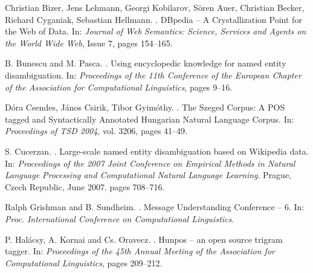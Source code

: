 \documentclass[11pt]{article}
\begin{document}
\begin{thebibliography}{}


Christian Bizer, Jens Lehmann, Georgi Kobilarov, Sören Auer, Christian Becker, Richard Cyganiak, Sebastian Hellmann.
.
\newblock DBpedia -- A Crystallization Point for the Web of Data. 
\newblock In: {\em Journal of Web Semantics: Science, Services and Agents on the World Wide Web}, Issue 7, pages 154--165.

B. Bunescu and M. Pasca.
.
\newblock Using encyclopedic knowledge for named entity disambiguation.
\newblock In: {\em Proceedings of the 11th Conference of the European Chapter of the Association for Computational Linguistics}, pages 9--16.

Dóra Csendes, János Csirik, Tibor Gyimóthy.
.
\newblock The Szeged Corpus: A POS tagged and Syntactically Annotated Hungarian Natural Language Corpus. 
\newblock In: {\em Proceedings of TSD 2004}, vol. 3206, pages 41--49.

S. Cucerzan.
.
\newblock Large-scale named entity disambiguation based on Wikipedia data.
\newblock In: {\em Proceedings of the 2007 Joint Conference on Empirical Methods in Natural Language Processing and Computational Natural Language Learning}.
\newblock Prague, Czech Republic, June 2007. pages 708--716.

Ralph Grishman and B. Sundheim.
.
\newblock Message Understanding Conference -- 6. 
\newblock In: {\em Proc. International Conference on Computational Linguistics}.

P. Halácsy, A. Kornai and Cs. Oravecz.
.
\newblock Hunpos -- an open source trigram tagger. 
\newblock In: {\em Proceedings of the 45th Annual Meeting of the Association for Computational Linguistics}, pages 209--212.


\end{thebibliography}
\end{document}

